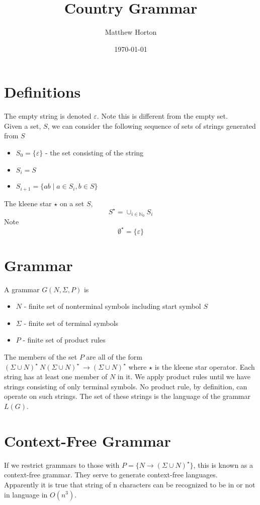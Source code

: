 \documentclass[a4paper]{scrartcl}
\title{Country Grammar}
\author{Matthew Horton}
\date{\today}
\begin{document}
\maketitle
\section{Definitions}
The empty string is denoted $\varepsilon$. Note this is different from the empty set.\\
Given a set, $S$, we can consider the following sequence of sets of strings generated from $S$
\begin{itemize}
\item{$S_{0} = \{\varepsilon\}$ - the set consisting of the string}
\item{$S_{i} = S$}
\item{$S_{i+1} = \{ab \mid a\in S_{i}, b\in S\}$}
\end{itemize}
The kleene star $\star$ on a set $S$, 
$$S^{\star} = \cup_{i\in\mathbb{N}_{0}} S_{i}$$
Note 
$$\emptyset^{\star} = \{ \varepsilon \}$$

\section{Grammar}
A grammar $G(N, \Sigma, P)$ is 
\begin{itemize}
\item{$N$ - finite set of nonterminal symbols including start symbol $S$}
\item{$\Sigma$ - finite set of terminal symbols}
\item{$P$ - finite set of product rules}
\end{itemize}
The members of the set $P$ are all of the form 
$(\Sigma \cup N)^\star\ N(\Sigma \cup N)^\star\ \rightarrow (\Sigma \cup N)^\star$ where $\star$ is the kleene star operator. Each string has at least one member of $N$ in it. We apply product rules until we have strings consisting of only terminal symbols. No product rule, by definition, can operate on such strings. The set of these strings is the language of the grammar $L(G)$. 

\section{Context-Free Grammar}
If we restrict grammars to those with $P = \{ N \rightarrow (\Sigma \cup N)^\star \}$, this is known as a context-free grammar. They serve to generate context-free languages.\\
Apparently it is true that string of n characters can be recognized to be in or not in language in $O(n^3)$.
\end{document}
